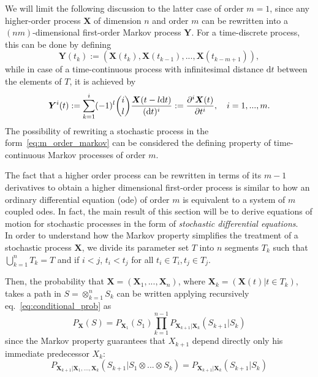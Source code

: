 \documentclass[a4paper,12pt]{book}
\begin{document}
We will limit the following discussion to the latter case of order $m=1$, since any higher-order process $\bm{X}$ of dimension $n$ and order $m$ can be rewritten into a $(nm)$-dimensional first-order Markov process $\bm{Y}$.  
For a time-discrete process, this can be done by defining
\begin{equation}
    \bm{Y}(t_k) := (\bm{X}(t_k),\bm{X}(t_{k-1}), ..., \bm{X}(t_{k-m+1}) ),
\end{equation}
while in case of a time-continuous process with infinitesimal distance $\mathrm{d}t$ between the elements of $T$, it is achieved by
\begin{equation}
\label{eq:m_order_markov}
    \bm{Y}^i(t) := \sum_{k=1}^i (-1)^l \binom{i}{l}
\frac{\bm{X}(t-l\mathrm{d}t)}{(\mathrm{d}t)^i} :=\pdv[order={i}]{\bm{X}(t)}{t}, \quad i=1,...,m.
\end{equation}
The possibility of rewriting a stochastic process in the form~\eqref{eq:m_order_markov} can be considered the defining
property of time-continuous Markov processes of order $m$. 

The fact that a higher order process can be rewritten in terms of its $m-1$ derivatives to obtain a higher dimensional first-order process is similar to how an ordinary differential equation (\acrshort{ode}) of order $m$ is equivalent to a system of $m$ coupled \acrshort{ode}s. In fact, the main result of this section will be to derive equations of motion for stochastic processes in the form of \textit{stochastic differential equations}. \\


In order to understand how the Markov property simplifies the treatment of a stochastic process $\bm{X}$, we divide its parameter set $T$ into $n$ segments $T_k$ such that $\bigcup_{k=1}^{n}T_k = T$ and if $i < j$, $t_i < t_j $ for all $t_i \in T_i,t_j \in T_j$.

Then, the probability that $\bm{X} = (\bm{X}_1,...,\bm{X}_n)$, where $\bm{X}_k = (\bm{X}(t)|t\in T_k)$, takes a path in $S = \otimes_{k=1}^{n} S_k $ can be written applying recursively eq.~\eqref{eq:conditional_prob} as
\begin{equation}
    \label{eq:markov_path}
    P_{\bm{X}}(S) = P_{\bm{X}_1}(S_1) \prod_{k=1}^{n-1} P_{\bm{X}_{k+1}|\bm{X}_{k}}(S_{k+1}|S_k)
\end{equation}
since the Markov property guarantees that $X_{k+1}$ depend directly only his immediate predecessor $X_k$: 
\begin{equation}
    \label{eq:transition_prob}
    P_{\bm{X}_{k+1}|\bm{X}_{1},...,\bm{X}_{k}}(S_{k+1}|S_1\otimes ... \otimes S_k) = P_{\bm{X}_{k+1}|\bm{X}_{k}}(S_{k+1}|S_k)
\end{equation}
\end{document}
